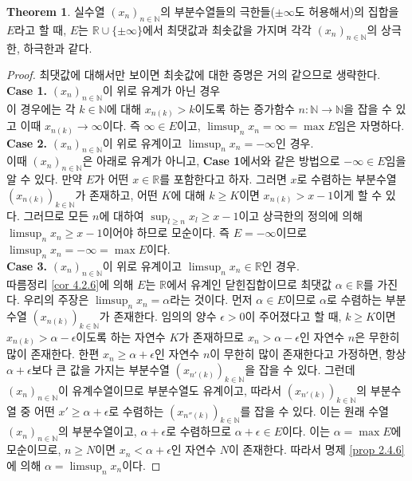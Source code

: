 \documentclass[11pt]{book}
\numberwithin{equation}{chapter}
\def\NN{\mathbb{N}}
\def\RR{\mathbb{R}}
\def\eps{\epsilon}
\theoremstyle{definition}
\newtheorem{thm}{Theorem}[section]
\begin{document}
\begin{thm}
    실수열 \((x_n)_{n \in \NN}\)의 부분수열들의 극한들(\(\pm \infty\)도 허용해서)의 집합을 \(E\)라고 할 때, \(E\)는 \(\RR \cup \{\pm \infty\}\)에서 최댓값과 최솟값을 가지며 각각 \((x_n)_{n \in \NN}\)의 상극한, 하극한과 같다.
\end{thm}
\begin{proof}
    최댓값에 대해서만 보이면 최솟값에 대한 증명은 거의 같으므로 생략한다.\\
    \textbf{Case 1.} \((x_n)_{n \in \NN}\)이 위로 유계가 아닌 경우\\
    이 경우에는 각 \(k \in \NN\)에 대해 \(x_{n(k)} > k\)이도록 하는 증가함수 \(n : \NN \to \NN\)을 잡을 수 있고 이때 \(x_{n(k)} \to \infty\)이다. 즉 \(\infty \in E\)이고, \(\limsup_n x_n = \infty = \max E\)임은 자명하다.\\
    \textbf{Case 2.} \((x_n)_{n \in \NN}\)이 위로 유계이고 \(\limsup_n x_n = - \infty\)인 경우.\\
    이때 \((x_n)_{n \in \NN}\)은 아래로 유계가 아니고, \textbf{Case 1}에서와 같은 방법으로 \(-\infty \in E\)임을 알 수 있다. 만약 \(E\)가 어떤 \(x \in \RR\)를 포함한다고 하자. 그러면 \(x\)로 수렴하는 부분수열 \((x_{n(k)})_{k \in \NN}\)가 존재하고, 어떤 \(K\)에 대해 \(k \ge K\)이면 \(x_{n(k)} > x -1 \)이게 할 수 있다. 그러므로 모든 \(n\)에 대하여 \(\sup_{l \ge n} x_l \ge x -1 \)이고 상극한의 정의에 의해 \(\limsup_n x_n \ge x-1\)이어야 하므로 모순이다. 즉 \(E = -\infty\)이므로 \(\limsup_n x_n = -\infty = \max E\)이다.\\
    \textbf{Case 3.} \((x_n)_{n \in \NN}\)이 위로 유계이고 \(\limsup_n x_n \in \RR\)인 경우.\\
    따름정리 \ref{cor 4.2.6}에 의해 \(E\)는 \(\RR\)에서 유계인 닫힌집합이므로 최댓값 \(\alpha \in \RR\)를 가진다. 우리의 주장은 \(\limsup_n x_n = \alpha\)라는 것이다. 먼저 \(\alpha \in E\)이므로 \(\alpha\)로 수렴하는 부분수열 \((x_{n(k)})_{k \in \NN}\)가 존재한다. 임의의 양수 \(\eps > 0\)이 주어졌다고 할 때, \(k \ge K\)이면 \(x_{n(k)} > \alpha - \eps\)이도록 하는 자연수 \(K\)가 존재하므로 \(x_n > \alpha - \eps\)인 자연수 \(n\)은 무한히 많이 존재한다. 한편 \(x_n \ge \alpha + \eps\)인 자연수 \(n\)이 무한히 많이 존재한다고 가정하면, 항상 \(\alpha + \eps\)보다 큰 값을 가지는 부분수열 \((x_{n'(k)})_{k \in \NN}\)을 잡을 수 있다. 그런데 \((x_n)_{n \in \NN}\)이 유계수열이므로 부분수열도 유계이고, 따라서 \((x_{n'(k)})_{k \in \NN}\)의 부분수열 중 어떤 \(x' \ge \alpha + \eps\)로 수렴하는 \((x_{n''(k)})_{k \in \NN}\)를 잡을 수 있다. 이는 원래 수열 \((x_n)_{n \in \NN}\)의 부분수열이고, \(\alpha + \eps\)로 수렴하므로 \(\alpha + \eps \in E\)이다. 이는 \(\alpha = \max E\)에 모순이므로, \(n \ge N\)이면 \(x_n < \alpha + \eps\)인 자연수 \(N\)이 존재한다. 따라서 명제 \ref{prop 2.4.6}에 의해 \(\alpha = \limsup_n x_n\)이다.
\end{proof}
\end{document}
